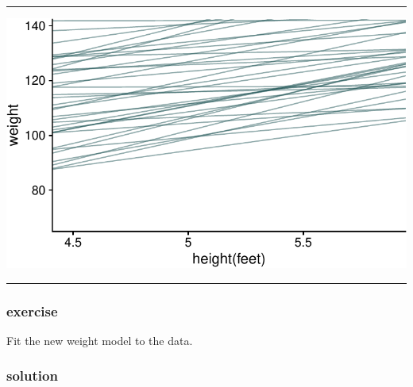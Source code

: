 \documentclass[
  letterpaper,
  DIV=11,
  numbers=noendperiod]{scrartcl}
\begin{document}
\begin{center}\rule{0.5\linewidth}{0.5pt}\end{center}

\includegraphics[width=17.1875in,height=\textheight]{lecture02-1_files/figure-pdf/unnamed-chunk-30-1.pdf}

\begin{center}\rule{0.5\linewidth}{0.5pt}\end{center}

\subsubsection{exercise}\label{exercise-4}

Fit the new weight model to the data.

\subsubsection{solution}\label{solution-2}
\end{document}
